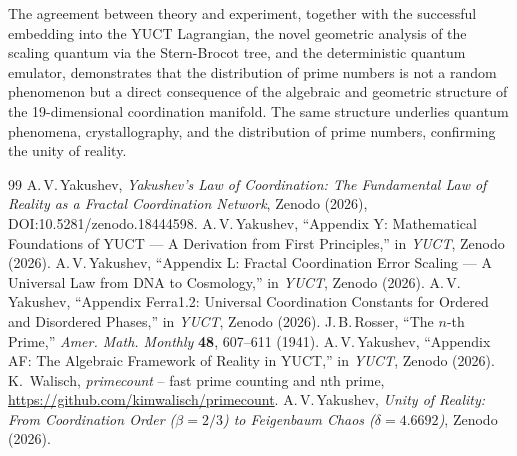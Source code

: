 \documentclass[12pt,a4paper]{article}
\begin{document}
	The agreement between theory and experiment, together with the successful embedding into the YUCT Lagrangian, the novel geometric analysis of the scaling quantum via the Stern-Brocot tree, and the deterministic quantum emulator, demonstrates that the distribution of prime numbers is not a random phenomenon but a direct consequence of the algebraic and geometric structure of the 19-dimensional coordination manifold.  The same structure underlies quantum phenomena, crystallography, and the distribution of prime numbers, confirming the unity of reality.
	
	\begin{thebibliography}{99}
		A.\,V.\,Yakushev, \emph{Yakushev's Law of Coordination: The Fundamental Law of Reality as a Fractal Coordination Network}, Zenodo (2026), DOI:10.5281/zenodo.18444598.
		A.\,V.\,Yakushev, ``Appendix Y: Mathematical Foundations of YUCT --- A Derivation from First Principles,'' in \emph{YUCT}, Zenodo (2026).
		A.\,V.\,Yakushev, ``Appendix L: Fractal Coordination Error Scaling --- A Universal Law from DNA to Cosmology,'' in \emph{YUCT}, Zenodo (2026).
		A.\,V.\,Yakushev, ``Appendix Ferra1.2: Universal Coordination Constants for Ordered and Disordered Phases,'' in \emph{YUCT}, Zenodo (2026).
		J.\,B.\,Rosser, ``The \(n\)-th Prime,'' \emph{Amer. Math. Monthly} \textbf{48}, 607--611 (1941).
		A.\,V.\,Yakushev, ``Appendix AF: The Algebraic Framework of Reality in YUCT,'' in \emph{YUCT}, Zenodo (2026).
		K.~Walisch, \emph{primecount} -- fast prime counting and nth prime, \url{https://github.com/kimwalisch/primecount}.
		A.\,V.\,Yakushev, \emph{Unity of Reality: From Coordination Order (\(\beta=2/3\)) to Feigenbaum Chaos (\(\delta=4.6692\))}, Zenodo (2026).
	\end{thebibliography}
	
\end{document}
